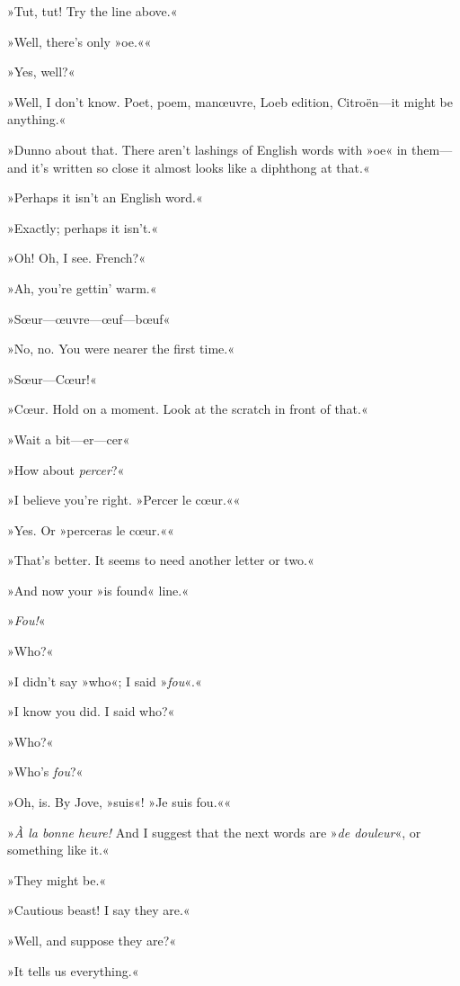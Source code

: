 »Tut, tut! Try the line above.«

»Well, there's only »oe.««

»Yes, well?«

»Well, I don't know. Poet, poem, manœuvre, Loeb edition, Citroën\allowbreak---\allowbreak it might be anything.«

»Dunno about that. There aren't lashings of English words with »oe« in them\allowbreak---\allowbreak and it's written so close it almost looks like a diphthong at that.«

»Perhaps it isn't an English word.«

»Exactly; perhaps it isn't.«

»Oh! Oh, I see. French?«

»Ah, you're gettin' warm.«

»Sœur\allowbreak---\allowbreak œuvre---œuf\allowbreak---\allowbreak bœuf\longdash«

»No, no. You were nearer the first time.«

»Sœur\allowbreak---\allowbreak Cœur!«

»Cœur. Hold on a moment. Look at the scratch in front of that.«

»Wait a bit\allowbreak---\allowbreak er---cer\longdash«

»How about \textit{percer}?«

»I believe you're right. »Percer le cœur.««

»Yes. Or »perceras le cœur.««

»That's better. It seems to need another letter or two.«

»And now your »is found« line.«

»\textit{Fou!}«

»Who?«

»I didn't say »who«; I said »\textit{fou}«.«

»I know you did. I said who?«

»Who?«

»Who's \textit{fou}?«

»Oh, is. By Jove, »suis«! »Je suis fou.««

»\textit{À la bonne heure!} And I suggest that the next words are »\textit{de douleur}«, or something like it.«

»They might be.«

»Cautious beast! I say they are.«

»Well, and suppose they are?«

»It tells us everything.«

